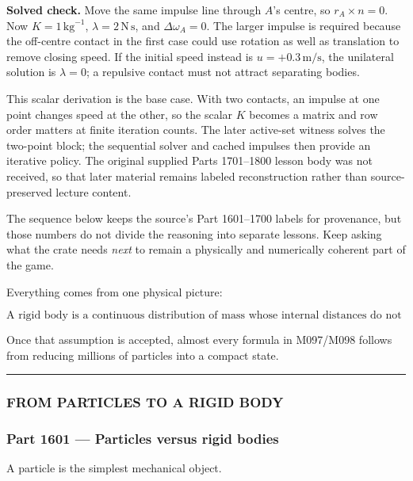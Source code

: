 \textbf{Solved check.} Move the same impulse line through \(A\)'s centre, so \(r_A\times n=0\). Now \(K=1\,\mathrm{kg}^{-1}\), \(\lambda=2\,\mathrm{N\,s}\), and \(\Delta\omega_A=0\). The larger impulse is required because the off-centre contact in the first case could use rotation as well as translation to remove closing speed. If the initial speed instead is \(u=+0.3\,\mathrm{m/s}\), the unilateral solution is \(\lambda=0\); a repulsive contact must not attract separating bodies.

This scalar derivation is the base case. With two contacts, an impulse at one point changes speed at the other, so the scalar \(K\) becomes a matrix and row order matters at finite iteration counts. The later active-set witness solves the two-point block; the sequential solver and cached impulses then provide an iterative policy. The original supplied Parts 1701--1800 lesson body was not received, so that later material remains labeled reconstruction rather than source-preserved lecture content.

The sequence below keeps the source's Part 1601--1700 labels for provenance, but those numbers do not divide the reasoning into separate lessons. Keep asking what the crate needs \emph{next} to remain a physically and numerically coherent part of the game.

Everything comes from one physical picture:

\[
\boxed{
\text{A rigid body is a continuous distribution of mass whose internal distances do not change.}
}
\]

Once that assumption is accepted, almost every formula in M097/M098 follows from reducing millions of particles into a compact state.

\begin{center}\rule{0.5\linewidth}{0.5pt}\end{center}

\subsubsection{FROM PARTICLES TO A RIGID BODY}\label{from-particles-to-a-rigid-body}

\subsubsection{Part 1601 --- Particles versus rigid bodies}\label{part-1601-particles-versus-rigid-bodies}

A particle is the simplest mechanical object.

